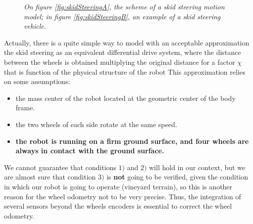 \begin{figure}
	\centering
	\qquad
	\caption{\textit{On figure \ref{fig:skidSteeringA}, the scheme of a skid steering motion model; in figure \ref{fig:skidSteeringB}, an example of a skid steering vehicle.}}
	\label{fig:skidSteering}
\end{figure}

Actually, there is a quite simple way  \parencite{skid2diff} to model with an acceptable approximation the skid steering as an equivalent differential drive system, where the distance between the wheels is obtained multiplying the original distance for a factor $\chi$ that is function of the physical structure of the robot
This approximation relies on some assumptions:
\begin{itemize}
	\item the mass center of the robot located at the geometric center of the body frame.
	\item the two wheels of each side rotate at the same speed.
	\item \textbf{the robot is running on a firm ground surface, and four wheels are always in contact with the ground surface.}
\end{itemize}
We cannot guarantee that conditions $1)$ and $2)$ will hold in our context, but we are almost sure that condition $3)$ is \textbf{not} going to be verified, given the condition in which our robot is going to operate (vineyard terrain), so this is another reason for the wheel odometry not to be very precise. Thus, the integration of several sensors beyond the wheels encoders is essential to correct the wheel odometry.

